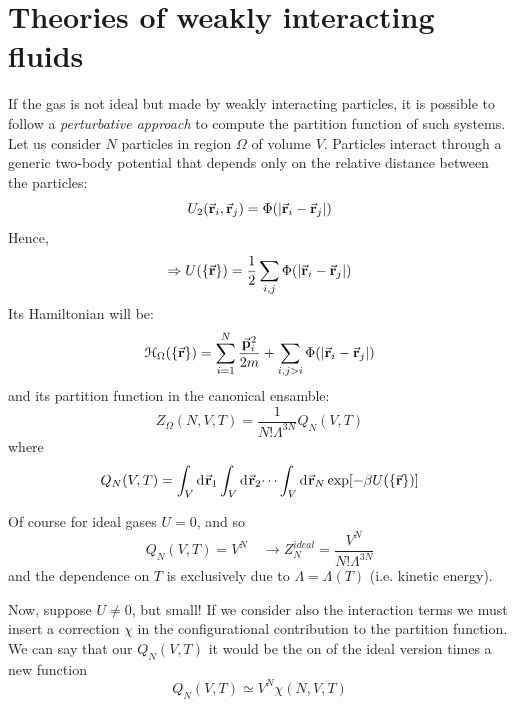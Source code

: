 \documentclass[../main/main.tex]{subfiles}
\begin{document}
\section{Theories of weakly interacting fluids}
If the gas is not ideal but made by weakly interacting particles, it is possible to follow a \emph{perturbative approach}  to compute the partition function of such systems. Let us consider \( N \) particles in region \( \Omega  \) of volume \( V \). Particles interact through a generic two-body potential that depends only on the relative distance between the particles:
\begin{equation*}
  U_2 ( \va{r}_i, \va{r}_j) = \Phi (\abs{\va{r}_i - \va{r}_j} )
\end{equation*}
Hence,
\begin{equation}
  \Rightarrow U ( \{ \va{r} \}  ) = \frac{1}{2} \sum_{i,j}^{} \Phi (\abs{\va{r}_i - \va{r}_j} )
\end{equation}
Its Hamiltonian will be:
\begin{equation}
  \mathcal{H}_ \Omega (\{ \va{r} \}  ) = \sum_{i=1}^{N} \frac{\va{p}_i^2}{2m} + \sum_{i,j>i}^{} \Phi (\abs{\va{r}_i - \va{r}_j} )
\end{equation}
and its partition function in the canonical ensamble:
\begin{equation}
  Z_ \Omega (N,V,T) = \frac{1}{N! \Lambda ^{3N}} Q_N (V,T)
\end{equation}
where
\begin{equation}
  Q_N (V,T) = \int_{V}^{} \dd[]{\va{r}_1} \int_{V}^{} \dd[]{\va{r}_2} \dots \int_{V}^{} \dd[]{\va{r}_N} \exp [- \beta U (\{ \va{r} \}  )]
\end{equation}
\begin{remark}
Of course for ideal gases \( U = 0 \), and so
\begin{equation*}
  Q_N (V,T) = V^N \quad \rightarrow Z_N^{ideal} = \frac{V^N}{N! \Lambda ^{3N}}
\end{equation*}
and the dependence on \( T \) is exclusively due to \( \Lambda = \Lambda (T) \) (i.e. kinetic energy).
\end{remark}
Now, suppose \( U \neq 0 \), but small!
If we consider also the interaction terms we must insert a correction \( \chi  \) in the configurational contribution to the partition function.
 We can say that our \( Q_N (V,T) \) it would be the on of the ideal version times a new function
\begin{equation}
 Q_N (V,T) \simeq V^N \chi (N,V,T)
\end{equation}
\end{document}
